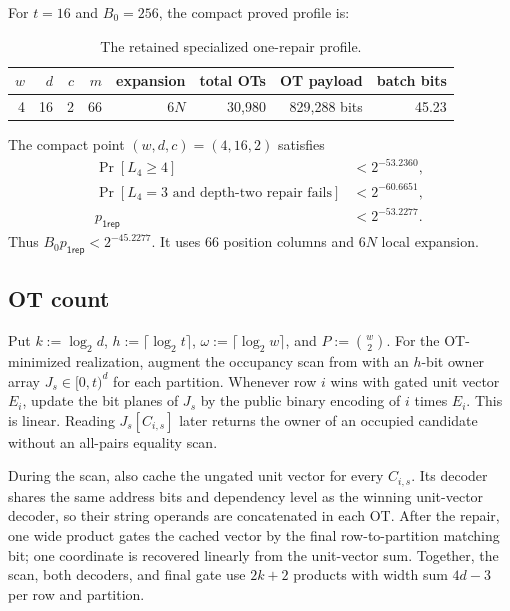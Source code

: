 For $t=16$ and $B_0=256$, the compact proved profile is:

\begin{table}[H]
\centering
\small
\begin{tabular}{@{}rrrrrrrr@{}}
\toprule
$w$ & $d$ & $c$ & $m$ & expansion & total OTs & OT payload & batch bits \\
\midrule
4 & 16 & 2 & 66 & $6N$ & 30{,}980 & 829{,}288 bits & 45.23 \\
\bottomrule
\end{tabular}
\caption{The retained specialized one-repair profile.
\label{tab:waterfall-one-repair-parameters}}
\end{table}

The compact point $(w,d,c)=(4,16,2)$ satisfies
\begin{align}
 \Pr[L_4\geq4]&<2^{-53.2360},\nonumber\\
 \Pr[L_4=3\text{ and depth-two repair fails}]&<2^{-60.6651},\nonumber\\
 p_{\mathsf{1rep}}&<2^{-53.2277}.
 \label{eq:waterfall-compact-point}
\end{align}
Thus $B_0p_{\mathsf{1rep}}<2^{-45.2277}$.  It uses 66 position columns and $6N$
local expansion.

\subsection{OT count}

Put $k:=\log_2d$, $h:=\lceil\log_2t\rceil$,
$\omega:=\lceil\log_2w\rceil$, and $P:=\binom w2$.  For the OT-minimized
realization, augment the occupancy scan from
 with an $h$-bit owner array
$J_s\in[0,t)^d$ for each partition.  Whenever row $i$ wins with gated unit vector
$E_i$, update the bit planes of $J_s$ by the public binary encoding of $i$
times $E_i$.  This is linear.  Reading $J_s[C_{i,s}]$ later returns the owner
of an occupied candidate without an all-pairs equality scan.

During the scan, also cache the ungated unit vector for every $C_{i,s}$.
Its decoder shares the same address bits and dependency level as the winning
unit-vector decoder, so their string operands are concatenated in each OT.
After the repair, one wide product gates the cached vector by the final
row-to-partition matching bit; one coordinate is recovered linearly from the
unit-vector sum.  Together, the scan, both decoders, and final gate use
$2k+2$ products with width sum $4d-3$ per row and partition.


